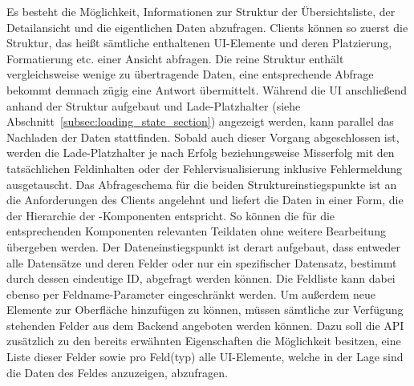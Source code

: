 Es besteht die Möglichkeit, Informationen zur Struktur der Übersichtsliste, der Detailansicht und die eigentlichen Daten abzufragen. Clients können so zuerst die Struktur, das heißt sämtliche enthaltenen UI-Elemente und deren Platzierung, Formatierung etc. einer Ansicht abfragen. Die reine Struktur enthält vergleichsweise wenige zu übertragende Daten, eine entsprechende Abfrage bekommt demnach zügig eine Antwort übermittelt. Während die UI anschließend anhand der Struktur aufgebaut und Lade-Platzhalter (siehe Abschnitt~\ref{subsec:loading_state_section}) angezeigt werden, kann parallel das Nachladen der Daten stattfinden. Sobald auch dieser Vorgang abgeschlossen ist, werden die Lade-Platzhalter je nach Erfolg beziehungsweise Misserfolg mit den tatsächlichen Feldinhalten oder der Fehlervisualisierung inklusive Fehlermeldung ausgetauscht.
Das Abfrageschema für die beiden Struktureinstiegspunkte ist an die Anforderungen des Clients angelehnt und liefert die Daten in einer Form, die der Hierarchie der -Komponenten entspricht. So können die für die entsprechenden Komponenten relevanten Teildaten ohne weitere Bearbeitung übergeben werden. Der Dateneinstiegspunkt ist derart aufgebaut, dass entweder alle Datensätze und deren Felder oder nur ein spezifischer Datensatz, bestimmt durch dessen eindeutige ID, abgefragt werden können. Die Feldliste kann dabei ebenso per Feldname-Parameter eingeschränkt werden.
Um außerdem neue Elemente zur Oberfläche hinzufügen zu können, müssen sämtliche zur Verfügung stehenden Felder aus dem Backend angeboten werden können. Dazu soll die API zusätzlich zu den bereits erwähnten Eigenschaften die Möglichkeit besitzen, eine Liste dieser Felder sowie pro Feld(typ) alle UI-Elemente, welche in der Lage sind die Daten des Feldes anzuzeigen, abzufragen.

